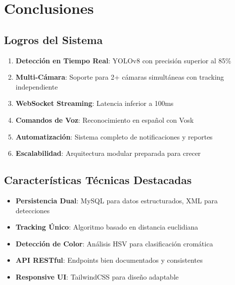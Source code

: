 \newpage

\section{Conclusiones}

\subsection{Logros del Sistema}

\begin{enumerate}
    \item \textbf{Detección en Tiempo Real}: YOLOv8 con precisión superior al 85\%
    \item \textbf{Multi-Cámara}: Soporte para 2+ cámaras simultáneas con tracking independiente
    \item \textbf{WebSocket Streaming}: Latencia inferior a 100ms
    \item \textbf{Comandos de Voz}: Reconocimiento en español con Vosk
    \item \textbf{Automatización}: Sistema completo de notificaciones y reportes
    \item \textbf{Escalabilidad}: Arquitectura modular preparada para crecer
\end{enumerate}

\subsection{Características Técnicas Destacadas}

\begin{itemize}
    \item \textbf{Persistencia Dual}: MySQL para datos estructurados, XML para detecciones
    \item \textbf{Tracking Único}: Algoritmo basado en distancia euclidiana
    \item \textbf{Detección de Color}: Análisis HSV para clasificación cromática
    \item \textbf{API RESTful}: Endpoints bien documentados y consistentes
    \item \textbf{Responsive UI}: TailwindCSS para diseño adaptable
\end{itemize}


